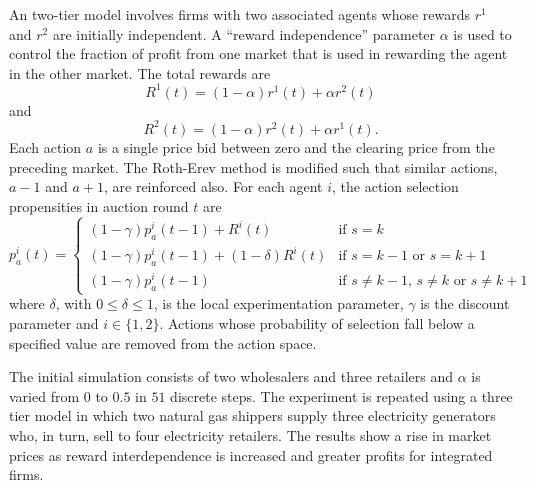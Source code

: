 An two-tier model involves firms with two associated agents
whose rewards $r^1$ and $r^2$ are initially independent.  A ``reward
independence'' parameter $\alpha$ is used to control the fraction of profit
from one market that is used in rewarding the agent in the other market.
The total rewards are
\begin{equation}
R^1(t) = (1-\alpha)r^1(t) + \alpha r^2(t)
\end{equation}
and
\begin{equation}
R^2(t) = (1-\alpha)r^2(t) + \alpha r^1(t).
\end{equation}
Each action $a$ is a single price bid between zero and the clearing price from
the preceding market.  The Roth-Erev method is modified such that similar
actions, $a-1$ and $a+1$, are reinforced also.  For each agent $i$, the action
selection propensities in auction round $t$ are
\begin{equation}
p^i_a(t) = \begin{cases}
(1-\gamma)p^i_a(t-1) + R^i(t)& \text{if $s=k$}\\
(1-\gamma)p^i_a(t-1) + (1-\delta)R^i(t)& \text{if $s=k-1$ or $s=k+1$}\\
(1-\gamma)p^i_a(t-1)& \text{if $s\neq k-1$, $s\neq k$ or $s\neq k+1$}
\end{cases}
\end{equation}
where $\delta$, with $0\leq \delta \leq 1$, is the local experimentation
parameter, $\gamma$ is the discount parameter and $i\in \lbrace 1,2 \rbrace$.
Actions whose probability of selection fall below a specified value are
removed from the action space.

The initial simulation consists of two wholesalers and three retailers and
$\alpha$ is varied from $0$ to $0.5$ in $51$ discrete steps.  The experiment
is repeated using a three tier model in which two natural gas shippers supply
three electricity generators who, in turn, sell to four electricity retailers.
The results show a rise in market prices as reward interdependence is
increased and greater profits for integrated firms.

